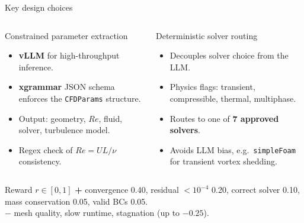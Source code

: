 \documentclass[aspectratio=169,10pt]{beamer}
\begin{document}
\begin{frame}{Key design choices}
\begin{columns}[T,onlytextwidth]
\begin{block}{Constrained parameter extraction}
\begin{itemize}\small
  \item \textbf{vLLM} for high-throughput inference.
  \item \textbf{xgrammar} JSON schema enforces the \texttt{CFDParams} structure.
  \item Output: geometry, $Re$, fluid, solver, turbulence model.
  \item Regex check of $Re = UL/\nu$ consistency.
\end{itemize}
\end{block}
\begin{block}{Deterministic solver routing}
\begin{itemize}\small
  \item Decouples solver choice from the LLM.
  \item Physics flags: transient, compressible, thermal, multiphase.
  \item Routes to one of \textbf{7 approved solvers}.
  \item Avoids LLM bias, e.g.\ \texttt{simpleFoam} for transient vortex shedding.
\end{itemize}
\end{block}
\end{columns}
\vspace{0.05cm}
\begin{alertblock}{Reward $r\in[0,1]$}
\footnotesize
\textbf{+} convergence 0.40, residual $<10^{-4}$ 0.20, correct solver 0.10, mass conservation 0.05, valid BCs 0.05.\\
\textbf{$-$} mesh quality, slow runtime, stagnation (up to $-0.25$).
\end{alertblock}
\end{frame}
\end{document}
